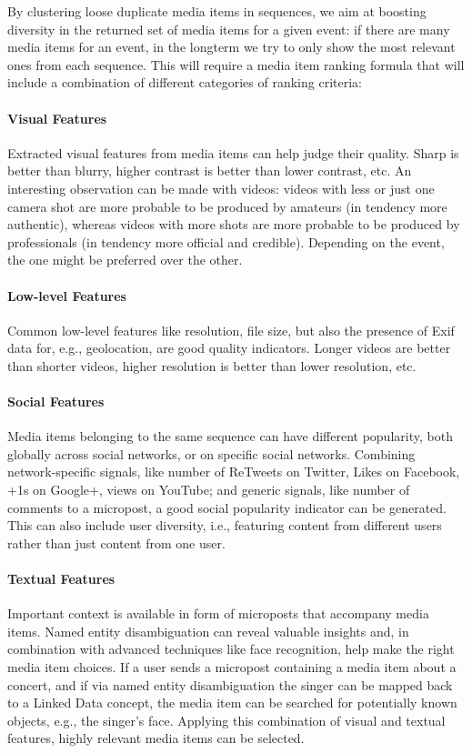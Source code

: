 \documentclass{acm_proc_article-sp}
\begin{document}
By clustering loose duplicate media items in sequences,
we aim at boosting diversity in the returned set of media items for a given event:
if there are many media items for an event,
in the longterm we try to only show the most relevant ones from each sequence.
This will require a media item ranking formula that will include a combination of different categories of ranking criteria:

\paragraph{Visual Features}
Extracted visual features from media items can help judge their quality.
Sharp is better than blurry, higher contrast is better than lower contrast, etc.
An interesting observation can be made with videos: videos with less or just one camera shot are more probable to be produced by amateurs (in tendency more authentic),
whereas videos with more shots are more probable to be produced by professionals (in tendency more official and credible).
Depending on the event, the one might be preferred over the other.

\paragraph{Low-level Features}
Common low-level features like resolution, file size, but also the presence of Exif data for, e.g.,
geolocation, are good quality indicators.
Longer videos are better than shorter videos, higher resolution is better than lower resolution, etc.

\paragraph{Social Features}
Media items belonging to the same sequence can have different popularity,
both globally across social networks, or on specific social networks.
Combining network-specific signals,
like number of ReTweets on Twitter, Likes on Facebook, +1s on Google+, views on YouTube;
and generic signals, like number of comments to a micropost,
a good social popularity indicator can be generated.
This can also include user diversity, i.e.,
featuring content from different users rather than just content from one user.

\paragraph{Textual Features}
Important context is available in form of microposts that accompany media items.
Named entity disambiguation can reveal valuable insights and, in combination with advanced techniques like face recognition,
help make the right media item choices.
If a user sends a micropost containing a media item about a concert, and if via named entity disambiguation the singer can be mapped back to a Linked Data concept,
the media item can be searched for potentially known objects, e.g., the singer's face.
Applying this combination of visual and textual features,
highly relevant media items can be selected.
\end{document}
